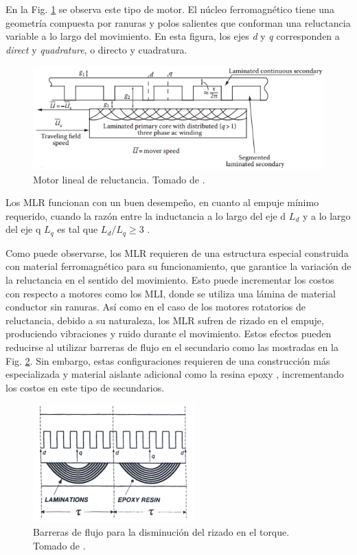 En la Fig. \ref{lrm1} se observa este tipo de motor. El núcleo ferromagnético tiene una geometría compuesta por ranuras y polos salientes que conforman una reluctancia variable a lo largo del movimiento. En esta figura, los ejes \textit{d} y \textit{q} corresponden a \textit{direct} y \textit{quadrature}, o directo y cuadratura.

\begin{figure}[hbtp]
\centering
\includegraphics[scale=0.7]{../img/lrm1.PNG}
\caption{Motor lineal de reluctancia. Tomado de \cite{boldea2013}.}
\label{lrm1}
\end{figure}

Los MLR funcionan con un buen desempeño, en cuanto al empuje mínimo requerido, cuando la razón entre la inductancia a lo largo del eje d $L_d$ y a lo largo del eje q $L_q$ es tal que $L_d/L_q \geq 3$ \cite{gieras2000}.

Como puede observarse, los MLR requieren de una estructura especial construida con material ferromagnético para su funcionamiento, que garantice la variación de la reluctancia en el sentido del movimiento. Esto puede incrementar los costos con respecto a motores como los MLI, donde se utiliza una lámina de material conductor sin ranuras. Así como en el caso de los motores rotatorios de reluctancia, debido a su naturaleza, los MLR sufren de rizado en el empuje, produciendo vibraciones y ruido durante el movimiento. Estos efectos pueden reducirse al utilizar barreras de flujo en el secundario como las mostradas en la Fig. \ref{lrmfluxbarriers}. Sin embargo, estas configuraciones requieren de una construcción más especializada y material aislante adicional como la resina epoxy \cite{gieras2000}, incrementando los costos en este tipo de secundarios.

\begin{figure}[hbtp]
\centering
\includegraphics[scale=1]{../img/lrmfluxbarriers.PNG}
\caption{Barreras de flujo para la disminución del rizado en el torque. Tomado de \cite{gieras2000}.}
\label{lrmfluxbarriers}
\end{figure}

